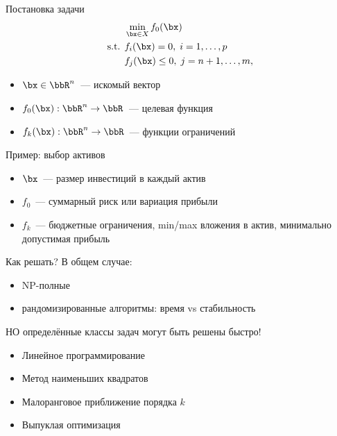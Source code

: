 \documentclass[12pt]{beamer}
\begin{document}
\begin{frame}{Постановка задачи}
\begin{equation*}
\begin{split}
&\min\limits_{\bx \in X} f_0(\bx)\\
\text{s.t. } & f_i(\bx) = 0, \; i = 1,\ldots,p\\
& f_j(\bx) \leq 0, \; j = n+1,\ldots,m,
\end{split}
\end{equation*}
\begin{itemize}
\item $\bx \in \bbR^n$~--- искомый вектор
\item $f_0(\bx): \bbR^n \rightarrow \bbR$~--- целевая функция
\item $f_k(\bx): \bbR^n \rightarrow \bbR$~--- функции ограничений
\end{itemize}
Пример: выбор активов
\begin{itemize}
\item $\bx$~--- размер инвестиций в каждый актив
\item $f_0$~--- суммарный риск или вариация прибыли
\item $f_k$~--- бюджетные ограничения, min/max вложения в актив, минимально допустимая прибыль
\end{itemize}

\end{frame}

\begin{frame}{Как решать?}
В общем случае:
\begin{itemize}
\item NP-полные
\item {\small рандомизированные алгоритмы: время vs стабильность}
\end{itemize}

{\small НО определённые классы задач могут быть решены быстро!}

\begin{itemize}
\item Линейное программирование
\item Метод наименьших квадратов
\item Малоранговое приближение порядка $k$
\item Выпуклая оптимизация
\end{itemize}
\end{frame}
\end{document}
